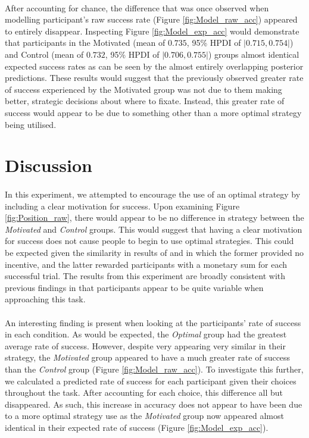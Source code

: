 \documentclass[12pt]{article}
\begin{document}
\paragraph{} After accounting for chance, the difference that was once observed when modelling participant's raw success rate (Figure \ref{fig:Model_raw_acc}) appeared to entirely disappear. Inspecting Figure \ref{fig:Model_exp_acc} would demonstrate that participants in the Motivated (mean of $0.735$, 95\% HPDI of $|0.715, 0.754|$) and Control (mean of $0.732$, 95\% HPDI of $|0.706, 0.755|$) groups almost identical expected success rates as can be seen by the almost entirely overlapping posterior predictions. These results would suggest that the previously observed greater rate of success experienced by the Motivated group was not due to them making better, strategic decisions about where to fixate. Instead, this greater rate of success would appear to be due to something other than a more optimal strategy being utilised. 


\section*{Discussion}

\paragraph{} In this experiment, we attempted to encourage the use of an optimal strategy by including a clear motivation for success. Upon examining Figure \ref{fig:Position_raw}, there would appear to be no difference in strategy between the \textit{Motivated} and \textit{Control} groups. This would suggest that having a clear motivation for success does not cause people to begin to use optimal strategies. This could be expected given the similarity in results of \cite{clarke2015failure} and \cite{morvan2012human} in which the former provided no incentive, and the latter rewarded participants with a monetary sum for each successful trial. The results from this experiment are broadly consistent with previous findings in that participants appear to be quite variable when approaching this task.
 
\paragraph{} An interesting finding is present when looking at the participants' rate of success in each condition. As would be expected, the \textit{Optimal} group had the greatest average rate of success. However, despite very appearing very similar in their strategy, the \textit{Motivated} group appeared to have a much greater rate of success than the \textit{Control} group (Figure \ref{fig:Model_raw_acc}). To investigate this further, we calculated a predicted rate of success for each participant given their choices throughout the task. After accounting for each choice, this difference all but disappeared. As such, this increase in accuracy does not appear to have been due to a more optimal strategy use as the \textit{Motivated} group now appeared almost identical in their expected rate of success (Figure \ref{fig:Model_exp_acc}).
\end{document}
